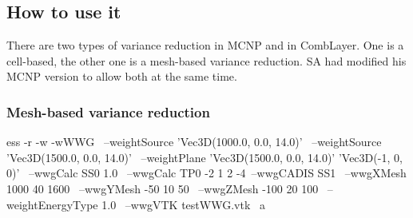 
\subsection{How to use it}
There are two types of variance reduction in MCNP and in CombLayer.
One is a cell-based, the other one is a mesh-based variance reduction.
SA had modified his MCNP version to allow both at the same time.

\subsubsection{Mesh-based variance reduction}
\label{sec:vr:cadis:mesh}
 \label{bash:vr:cadis:mesh:run}
\begin{bash}
ess -r -w -wWWG \ 
 --weightSource 'Vec3D(1000.0, 0.0, 14.0)' \
 --weightSource 'Vec3D(1500.0, 0.0, 14.0)' \
 --weightPlane 'Vec3D(1500.0, 0.0, 14.0)' 'Vec3D(-1, 0, 0)' \
 --wwgCalc SS0 1.0 \
 --wwgCalc TP0 -2 1 2 -4\
 --wwgCADIS SS1 \
 --wwgXMesh 1000 40 1600 \
 --wwgYMesh -50 10 50 \
 --wwgZMesh -100 20 100 \
 --weightEnergyType 1.0 \
 --wwgVTK testWWG.vtk \
   a
\end{bash}

